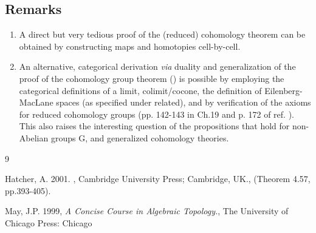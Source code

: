 \documentclass[12pt]{article}
\theoremstyle{plain}
\theoremstyle{definition}
\theoremstyle{plain}
\numberwithin{equation}{section}
\begin{document}
\subsection{Remarks}
\begin{enumerate}
\item A direct but very tedious proof of the (reduced) cohomology theorem can be obtained by constructing maps and homotopies cell-by-cell. 

\item An alternative, categorical derivation {\em via} duality and generalization of the proof of the cohomology group theorem (\cite{May1999}) is possible by employing the categorical definitions of a limit, colimit/cocone, the definition of Eilenberg-MacLane spaces (as specified under related), and by verification of the axioms for reduced cohomology groups (pp. 142-143 in Ch.19 and p. 172 of ref. \cite{May1999}).
This also raises the interesting question of the propositions that hold for non-Abelian groups G, and generalized cohomology theories.
\end{enumerate}

\begin{thebibliography} {9}

Hatcher, A. 2001. , Cambridge University Press; Cambridge, UK., (Theorem 4.57, pp.393-405).

May, J.P. 1999, \emph{A Concise Course in Algebraic Topology.}, The University of Chicago Press: Chicago

\end{thebibliography}
\end{document}
